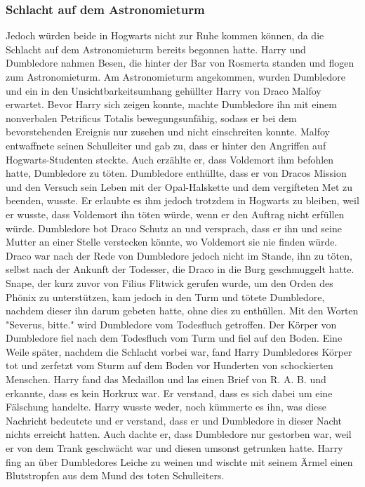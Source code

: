 \documentclass[a4paper, 10pt]{article}
\begin{document}
\subsubsection*{Schlacht auf dem Astronomieturm}
Jedoch würden beide in Hogwarts nicht zur Ruhe kommen können, da die Schlacht auf dem Astronomieturm bereits begonnen hatte. Harry und Dumbledore nahmen Besen, die hinter der Bar von Rosmerta standen und flogen zum Astronomieturm. Am Astronomieturm angekommen, wurden Dumbledore und ein in den Unsichtbarkeitsumhang gehüllter Harry von Draco Malfoy erwartet. Bevor Harry sich zeigen konnte, machte Dumbledore ihn mit einem nonverbalen Petrificus Totalis bewegungsunfähig, sodass er bei dem bevorstehenden Ereignis nur zusehen und nicht einschreiten konnte.
\vspace{10pt}
\newline
{}  
Malfoy entwaffnete seinen Schulleiter und gab zu, dass er hinter den Angriffen auf Hogwarts-Studenten steckte. Auch erzählte er, dass Voldemort ihm befohlen hatte, Dumbledore zu töten. Dumbledore enthüllte, dass er von Dracos Mission und den Versuch sein Leben mit der Opal-Halskette und dem vergifteten Met zu beenden, wusste. Er erlaubte es ihm jedoch trotzdem in Hogwarts zu bleiben, weil er wusste, dass Voldemort ihn töten würde, wenn er den Auftrag nicht erfüllen würde. Dumbledore bot Draco Schutz an und versprach, dass er ihn und seine Mutter an einer Stelle verstecken könnte, wo Voldemort sie nie finden würde. Draco war nach der Rede von Dumbledore jedoch nicht im Stande, ihn zu töten, selbst nach der Ankunft der Todesser, die Draco in die Burg geschmuggelt hatte.
\vspace{10pt}
\newline
{}  
Snape, der kurz zuvor von Filius Flitwick gerufen wurde, um den Orden des Phönix zu unterstützen, kam jedoch in den Turm und tötete Dumbledore, nachdem dieser ihn darum gebeten hatte, ohne dies zu enthüllen. Mit den Worten "Severus, bitte." wird Dumbledore vom Todesfluch getroffen. Der Körper von Dumbledore fiel nach dem Todesfluch vom Turm und fiel auf den Boden.
\vspace{10pt}
\newline
{}  
Eine Weile später, nachdem die Schlacht vorbei war, fand Harry Dumbledores Körper tot und zerfetzt vom Sturm auf dem Boden vor Hunderten von schockierten Menschen. Harry fand das Medaillon und las einen Brief von R. A. B. und erkannte, dass es kein Horkrux war. Er verstand, dass es sich dabei um eine Fälschung handelte. Harry wusste weder, noch kümmerte es ihn, was diese Nachricht bedeutete und er verstand, dass er und Dumbledore in dieser Nacht nichts erreicht hatten. Auch dachte er, dass Dumbledore nur gestorben war, weil er von dem Trank geschwächt war und diesen umsonst getrunken hatte. Harry fing an über Dumbledores Leiche zu weinen und wischte mit seinem Ärmel einen Blutstropfen aus dem Mund des toten Schulleiters.
\end{document}
